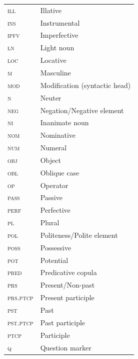 \begin{tabularx}{.45\textwidth}{@{}lQ}
\textsc{ill} & Illative\\
\textsc{ins} & Instrumental\\
\textsc{ipfv} & Imperfective\\
\textsc{ln} & Light noun\\
\textsc{loc} & Locative\\
\textsc{m} & Masculine\\
\textsc{mod} & Modification (syntactic head)\\
\textsc{n} & Neuter\\
\textsc{neg} & Negation/Negative element\\
\textsc{ni} & Inanimate noun\\
\textsc{nom} & Nominative\\
\textsc{num} & Numeral\\
\textsc{obj} & Object\\
\textsc{obl} & Oblique case\\
\textsc{op} & Operator\\
\textsc{pass} & Passive\\
\textsc{perf} & Perfective\\
\textsc{pl} & Plural\\
\textsc{pol} & Politeness/Polite element\\
\textsc{poss} & Possessive\\
\textsc{pot} & Potential\\
\textsc{pred} & Predicative copula\\
\textsc{prs} & Present/Non-past\\
\textsc{prs.ptcp} & Present participle\\
\textsc{pst} & Past\\
\textsc{pst.ptcp} & Past participle\\
\textsc{ptcp} & Participle\\
\textsc{q} & Question marker\\
\end{tabularx}

